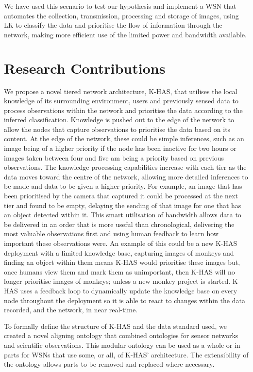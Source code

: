 We have used this scenario to test our hypothesis and implement a WSN that automates the collection, transmission, processing and storage of images, using LK to classify the data and prioritise the flow of information through the network, making more efficient use of the limited power and bandwidth available. 

\section{Research Contributions}
We propose a novel tiered network architecture, K-HAS, that utilises the local knowledge of its surrounding environment, users and previously sensed data to process observations within the network and prioritise the data according to the inferred classification. Knowledge is pushed out to the edge of the network to allow the nodes that capture observations to prioritise the data based on its content. At the edge of the network, these could be simple inferences, such as an image being of a higher priority if the node has been inactive for two hours or images taken between four and five am being a priority based on previous observations. The knowledge processing capabilities increase with each tier as the data moves toward the centre of the network, allowing more detailed inferences to be made and data to be given a higher priority. For example, an image that has been prioritised by the camera that captured it could be processed at the next tier and found to be empty, delaying the sending of that image for one that has an object detected within it. This smart utilisation of bandwidth allows data to be delivered in an order that is more useful than chronological, delivering the most valuable observations first and using human feedback to learn how important these observations were. An example of this could be a new K-HAS deployment with a limited knowledge base, capturing images of monkeys and finding an object within them means K-HAS would prioritise these images but, once humans view them and mark them as unimportant, then K-HAS will no longer prioritise images of monkeys; unless a new monkey project is started. K-HAS uses a feedback loop to dynamically update the knowledge base on every node throughout the deployment so it is able to react to changes within the data recorded, and the network, in near real-time.

To formally define the structure of K-HAS and the data standard used, we created a novel aligning ontology that combined ontologies for sensor networks and scientific observations. This modular ontology can be used as a whole or in parts for WSNs that use some, or all, of K-HAS' architecture. The extensibility of the ontology allows parts to be removed and replaced where necessary.


